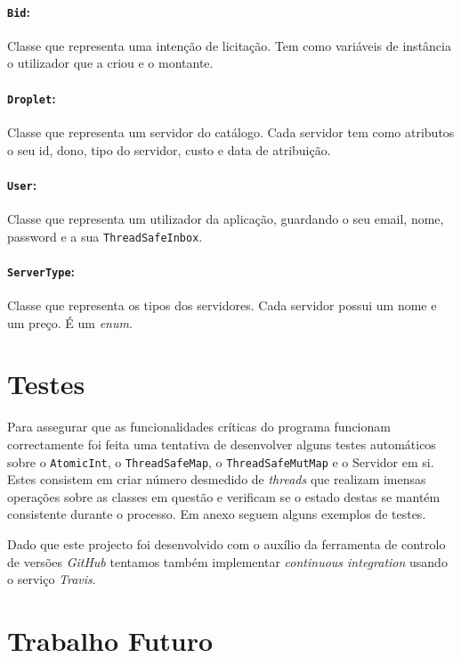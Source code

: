 \documentclass[a4paper]{article}
\begin{document}
\paragraph{\texttt{Bid}:}
Classe que representa uma intenção de licitação. Tem como variáveis de instância o utilizador que a criou e o montante.

\paragraph{\texttt{Droplet}:}
Classe que representa um servidor do catálogo. Cada servidor tem como atributos o seu id, dono, tipo do servidor, custo e data de atribuição.

\paragraph{\texttt{User}:}
Classe que representa um utilizador da aplicação, guardando o seu email, nome, password e a sua \texttt{ThreadSafeInbox}.

\paragraph{\texttt{ServerType}:}
Classe que representa os tipos dos servidores. Cada servidor possui um nome e um preço. É um \textit{enum}.


\section{Testes}
Para assegurar que as funcionalidades críticas do programa funcionam correctamente foi feita uma tentativa de desenvolver alguns testes automáticos sobre o \texttt{AtomicInt}, o \texttt{ThreadSafeMap}, o \texttt{ThreadSafeMutMap} e o Servidor em si. Estes consistem em criar número desmedido de \textit{threads} que realizam imensas operações sobre as classes em questão e verificam se o estado destas se mantém consistente durante o processo. Em anexo seguem alguns exemplos de testes.

Dado que este projecto foi desenvolvido com o auxílio da ferramenta de controlo de versões \textit{GitHub} tentamos também implementar \textit{continuous integration} usando o serviço \textit{Travis}.

\pagebreak
\section{Trabalho Futuro}
\end{document}
